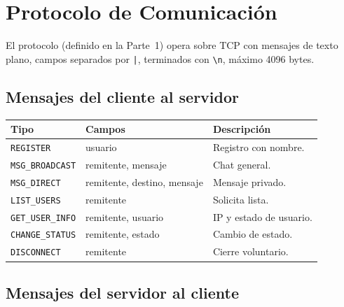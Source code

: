 \documentclass[12pt,a4paper]{article}
\begin{document}
\section{Protocolo de Comunicación}
\label{sec:protocolo}

El protocolo (definido en la Parte~1) opera sobre TCP con mensajes de texto plano,
campos separados por \texttt{|}, terminados con \texttt{\textbackslash n}, máximo
4096 bytes.

\subsection{Mensajes del cliente al servidor}

\begin{center}
\begin{tabular}{llp{6cm}}
\toprule
\textbf{Tipo} & \textbf{Campos} & \textbf{Descripción} \\
\midrule
\texttt{REGISTER}        & usuario                     & Registro con nombre. \\
\texttt{MSG\_BROADCAST}  & remitente, mensaje           & Chat general. \\
\texttt{MSG\_DIRECT}     & remitente, destino, mensaje  & Mensaje privado. \\
\texttt{LIST\_USERS}     & remitente                    & Solicita lista. \\
\texttt{GET\_USER\_INFO} & remitente, usuario           & IP y estado de usuario. \\
\texttt{CHANGE\_STATUS}  & remitente, estado            & Cambio de estado. \\
\texttt{DISCONNECT}      & remitente                    & Cierre voluntario. \\
\bottomrule
\end{tabular}
\end{center}

\subsection{Mensajes del servidor al cliente}
\end{document}
